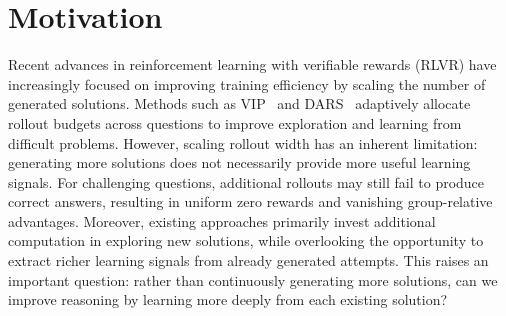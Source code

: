 \documentclass[11pt]{article}
\theoremstyle{definition}
\theoremstyle{plain}
\begin{document}
\begin{center}
\caption{Two ways to spend extra training compute on a hard question. (a) Scaling rollout width samples more solutions, but if all of them fail, every reward is $0$ and the group-relative advantages vanish. (b) Scaling verification depth (ours) verifies each existing solution over several rounds, each judging the previous verdict.}
\label{fig:teaser}
\end{center}


\section{Motivation}
Recent advances in reinforcement learning with verifiable rewards (RLVR) have increasingly focused on improving training efficiency by scaling the number of generated solutions. Methods such as VIP~\citep{nguyen2026adaptive} and DARS~\citep{yang2026depth} adaptively allocate rollout budgets across questions to improve exploration and learning from difficult problems. However, scaling rollout width has an inherent limitation: generating more solutions does not necessarily provide more useful learning signals. For challenging questions, additional rollouts may still fail to produce correct answers, resulting in uniform zero rewards and vanishing group-relative advantages. Moreover, existing approaches primarily invest additional computation in exploring new solutions, while overlooking the opportunity to extract richer learning signals from already generated attempts. This raises an important question: rather than continuously generating more solutions, can we improve reasoning by learning more deeply from each existing solution?
\end{document}
